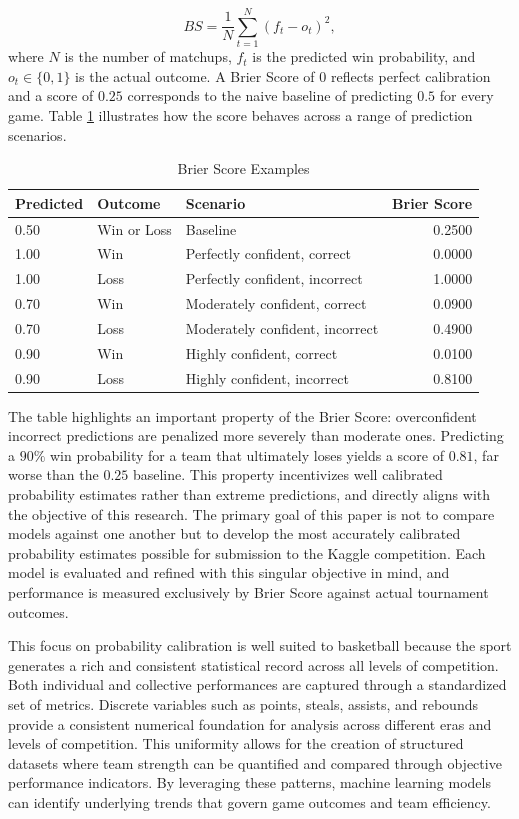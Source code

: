 \documentclass[12pt,leqno]{article}\usepackage[pdftex]{graphicx}\usepackage[dvipsnames]{xcolor}
\theoremstyle{remark}
\begin{document}
\begin{equation}
BS = \frac{1}{N} \sum_{t=1}^{N} (f_t - o_t)^2,
\end{equation}
where $N$ is the number of matchups, $f_t$ is the predicted win probability, and $o_t \in \{0, 1\}$ is the actual outcome. A Brier Score of $0$ reflects perfect calibration and a score of $0.25$ corresponds to the naive baseline of predicting $0.5$ for every game. Table \ref{tab:brier} illustrates how the score behaves across a range of prediction scenarios.

\begin{table}[h]
\centering
\begin{tabular}{lllr}
\hline
\textbf{Predicted} & \textbf{Outcome} & \textbf{Scenario} & \textbf{Brier Score} \\
\hline
0.50 & Win or Loss & Baseline & 0.2500 \\
1.00 & Win         & Perfectly confident, correct   & 0.0000 \\
1.00 & Loss        & Perfectly confident, incorrect & 1.0000 \\
0.70 & Win         & Moderately confident, correct  & 0.0900 \\
0.70 & Loss        & Moderately confident, incorrect & 0.4900 \\
0.90 & Win         & Highly confident, correct      & 0.0100 \\
0.90 & Loss        & Highly confident, incorrect    & 0.8100 \\
\hline
\end{tabular}
\caption{Brier Score Examples}
\label{tab:brier}
\end{table}

The table highlights an important property of the Brier Score: overconfident incorrect predictions are penalized more severely than moderate ones. Predicting a $90\%$ win probability for a team that ultimately loses yields a score of $0.81$, far worse than the $0.25$ baseline. This property incentivizes well calibrated probability estimates rather than extreme predictions, and directly aligns with the objective of this research. The primary goal of this paper is not to compare models against one another but to develop the most accurately calibrated probability estimates possible for submission to the Kaggle competition. Each model is evaluated and refined with this singular objective in mind, and performance is measured exclusively by Brier Score against actual tournament outcomes.

This focus on probability calibration is well suited to basketball because the sport generates a rich and consistent statistical record across all levels of competition. Both individual and collective performances are captured through a standardized set of metrics. Discrete variables such as points, steals, assists, and rebounds provide a consistent numerical foundation for analysis across different eras and levels of competition. This uniformity allows for the creation of structured datasets where team strength can be quantified and compared through objective performance indicators. By leveraging these patterns, machine learning models can identify underlying trends that govern game outcomes and team efficiency.
\end{document}
